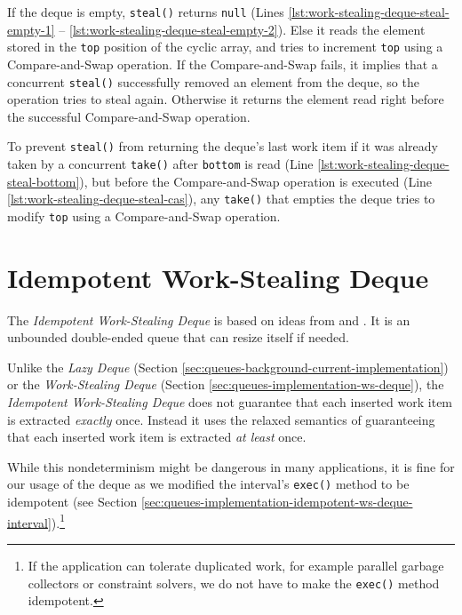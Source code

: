 If the deque is empty, \lstinline!steal()! returns \lstinline!null!
(Lines \ref{lst:work-stealing-deque-steal-empty-1} --
\ref{lst:work-stealing-deque-steal-empty-2}). Else it reads the
element stored in the \lstinline!top! position of the cyclic array,
and tries to increment \lstinline!top! using a Compare-and-Swap
operation. If the Compare-and-Swap fails, it implies that a concurrent
\lstinline!steal()! successfully removed an element from the deque, so
the operation tries to steal again. Otherwise it returns the element
read right before the successful Compare-and-Swap operation.

To prevent \lstinline!steal()! from returning the deque's last work
item if it was already taken by a concurrent \lstinline!take()! after
\lstinline!bottom! is read (Line
\ref{lst:work-stealing-deque-steal-bottom}), but before the
Compare-and-Swap operation is executed (Line
\ref{lst:work-stealing-deque-steal-cas}), any \lstinline!take()! that
empties the deque tries to modify \lstinline!top! using a
Compare-and-Swap operation.



\section{Idempotent Work-Stealing Deque}
\label{sec:queues-implementation-idempotent-ws-deque}

The \emph{Idempotent Work-Stealing Deque} is based on ideas from
\cite{Leijen2009} and \cite{Michael2009}. It is an unbounded
double-ended queue that can resize itself if needed.

Unlike the \emph{Lazy Deque} (Section
\ref{sec:queues-background-current-implementation}) or the
\emph{Work-Stealing Deque} (Section
\ref{sec:queues-implementation-ws-deque}), the \emph{Idempotent
Work-Stealing Deque} does not guarantee that each inserted work item
is extracted \emph{exactly} once. Instead it uses the relaxed
semantics of guaranteeing that each inserted work item is extracted
\emph{at least} once.

While this nondeterminism might be dangerous in many applications, it
is fine for our usage of the deque as we modified the interval's
\lstinline!exec()! method to be idempotent (see Section
\ref{sec:queues-implementation-idempotent-ws-deque-interval}).\footnote{If
the application can tolerate duplicated work, for example parallel
garbage collectors or constraint solvers, we do not have to make the
\verb!exec()! method idempotent.}

